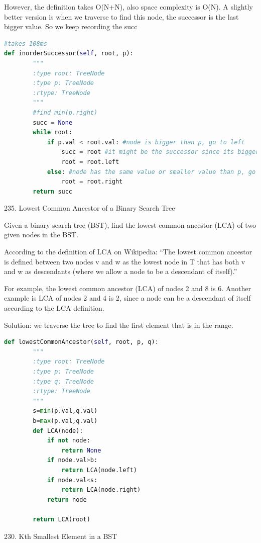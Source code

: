 \documentclass[../main.tex]{subfiles}
\begin{document}
However, the definition takes O(N+N), also space complexity is O(N). A slightly better version is when we traverse to find this node, the successor is the last bigger value. So we keep recording the succ
\begin{lstlisting}[language = Python]
#takes 108ms
def inorderSuccessor(self, root, p):
        """
        :type root: TreeNode
        :type p: TreeNode
        :rtype: TreeNode
        """
        #find min(p.right)
        succ = None
        while root:
            if p.val < root.val: #node is bigger than p, go to left
                succ = root #it might be the successor since its bigger
                root = root.left
            else: #node has the same value or smaller value than p, go to right
                root = root.right
        return succ
\end{lstlisting}
235. Lowest Common Ancestor of a Binary Search Tree

Given a binary search tree (BST), find the lowest common ancestor (LCA) of two given nodes in the BST.

According to the definition of LCA on Wikipedia: “The lowest common ancestor is defined between two nodes v and w as the lowest node in T that has both v and w as descendants (where we allow a node to be a descendant of itself).”

For example, the lowest common ancestor (LCA) of nodes 2 and 8 is 6. Another example is LCA of nodes 2 and 4 is 2, since a node can be a descendant of itself according to the LCA definition.

Solution: we traverse the tree to find the first element that is in the range.
\begin{lstlisting}[language = Python]
def lowestCommonAncestor(self, root, p, q):
        """
        :type root: TreeNode
        :type p: TreeNode
        :type q: TreeNode
        :rtype: TreeNode
        """
        s=min(p.val,q.val)
        b=max(p.val,q.val)
        def LCA(node):
            if not node:
                return None
            if node.val>b:
                return LCA(node.left)
            if node.val<s:
                return LCA(node.right)
            return node
            
        return LCA(root)
\end{lstlisting}
230. Kth Smallest Element in a BST
\end{document}

